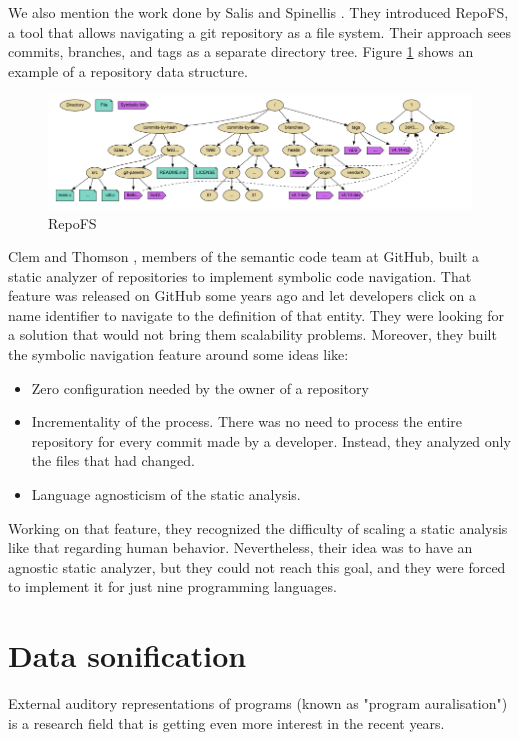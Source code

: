 \bigbreak
We also mention the work done by Salis and Spinellis \cite[]{Salis2019}.
They introduced RepoFS, a tool that allows navigating a git repository as a file system. 
Their approach sees commits, branches, and tags as a separate directory tree. 
Figure \ref{fig:RepoFS} shows an example of a repository data structure. 

\begin{figure}[H]
\centering
  \includegraphics[width=0.9\linewidth]{Salis2019.png} 
  \caption{RepoFS}
  \label{fig:RepoFS}
\end{figure}

\bigbreak
Clem and Thomson \cite[]{Clem2021}, members of the semantic code team at GitHub, built a static analyzer of repositories to implement symbolic code navigation. 
That feature was released on GitHub some years ago and let developers click on a name identifier to navigate to the definition of that entity. 
They were looking for a solution that would not bring them scalability problems. 
Moreover, they built the symbolic navigation feature around some ideas like:
\begin{itemize}
  \item Zero configuration needed by the owner of a repository
  \item Incrementality of the process. There was no need to process the entire repository for every commit made by a developer. Instead, they analyzed only the files that had changed. 
  \item Language agnosticism of the static analysis. 
\end{itemize}

Working on that feature, they recognized the difficulty of scaling a static analysis like that regarding human behavior. 
Nevertheless, their idea was to have an agnostic static analyzer, but they could not reach this goal, and they were forced to implement it for just nine programming languages.  

\section{Data sonification}

External auditory representations of programs (known as "program auralisation") is a research field that 
is getting even more interest in the recent years.


